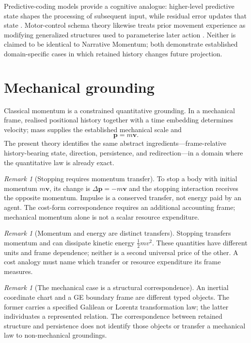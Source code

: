 \documentclass[11pt,a4paper]{article}
\theoremstyle{remark}
\newtheorem{remark}[definition]{Remark}
\begin{document}
Predictive-coding models provide a cognitive analogue: higher-level predictive state shapes the processing of subsequent input, while residual error updates that state \citep{rao1999}. Motor-control schema theory likewise treats prior movement experience as modifying generalized structures used to parameterise later action \citep{schmidt1975}. Neither is claimed to be identical to Narrative Momentum; both demonstrate established domain-specific cases in which retained history changes future projection.

\section{Mechanical grounding}\label{sec:mechanics}
Classical momentum is a constrained quantitative grounding. In a mechanical frame, realised positional history together with a time embedding determines velocity; mass supplies the established mechanical scale and
\[
\mathbf p=m\mathbf v.
\]
The present theory identifies the same abstract ingredients---frame-relative history-bearing state, direction, persistence, and redirection---in a domain where the quantitative law is already exact.

\begin{remark}[Stopping requires momentum transfer]\label{rem:impulse}
To stop a body with initial momentum $m\mathbf v$, its change is
$\Delta\mathbf p=-m\mathbf v$ and the stopping interaction receives the
opposite momentum. Impulse is a conserved transfer, not energy paid by an
agent. The cost-form correspondence requires an additional accounting frame;
mechanical momentum alone is not a scalar resource expenditure.
\end{remark}

\begin{remark}[Momentum and energy are distinct transfers]\label{rem:currencies}
Stopping transfers momentum and can dissipate kinetic energy
$\tfrac12mv^2$. These quantities have different units and frame dependence;
neither is a second universal price of the other. A cost analogy must name
which transfer or resource expenditure its frame measures.
\end{remark}

\begin{remark}[The mechanical case is a structural correspondence]\label{rem:not-analogy}
An inertial coordinate chart and a GE boundary frame are different typed
objects. The former carries a specified Galilean or Lorentz transformation
law; the latter individuates a represented relation. The correspondence
between retained structure and persistence does not identify those objects
or transfer a mechanical law to non-mechanical groundings.
\end{remark}
\end{document}
